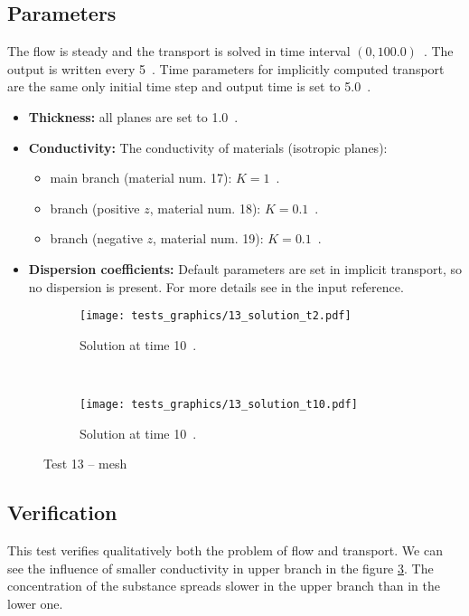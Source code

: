 \subsection*{Parameters}
The flow is steady and the transport is solved in time interval $(0,100.0)$~. 
The output is written every 5~. 
Time parameters for implicitly computed transport are the same only initial time step and output time is set to 5.0~.
\begin{itemize}
  \item \textbf{Thickness:} all planes are set to 1.0~.
  \item \textbf{Conductivity:} The conductivity of materials (isotropic planes):
    \begin{itemize}
      \item main branch (material num. 17): $K=1$~.
      \item branch (positive $z$, material num. 18): $K=0.1$~.
      \item branch (negative $z$, material num. 19): $K=0.1$~.
    \end{itemize}
  \item \textbf{Dispersion coefficients:} Default parameters are set in implicit transport, so no dispersion is present. 
        For more details see  in the input reference.
\end{itemize}
%
\begin{figure}[!h]
    \centering
    \begin{subfigure}[b]{0.45\textwidth}
        \centering
        \texttt{[image: tests\_graphics/13\_solution\_t2.pdf]}
        \caption{Solution at time 10~.}
        \label{fig:test13_a}
    \end{subfigure}
    ~
    \begin{subfigure}[b]{0.45\textwidth}
        \centering
        \texttt{[image: tests\_graphics/13\_solution\_t10.pdf]}
        \caption{Solution at time 10~.}
        \label{fig:test13_b}
    \end{subfigure}
    \caption{Test 13 -- mesh}
  \label{fig:test13}
\end{figure}
%
\subsection*{Verification}
This test verifies qualitatively both the problem of flow and transport. We can see the influence of smaller conductivity 
in upper branch in the figure \ref{fig:test13}. The concentration of the substance spreads slower in the upper branch than 
in the lower one.

